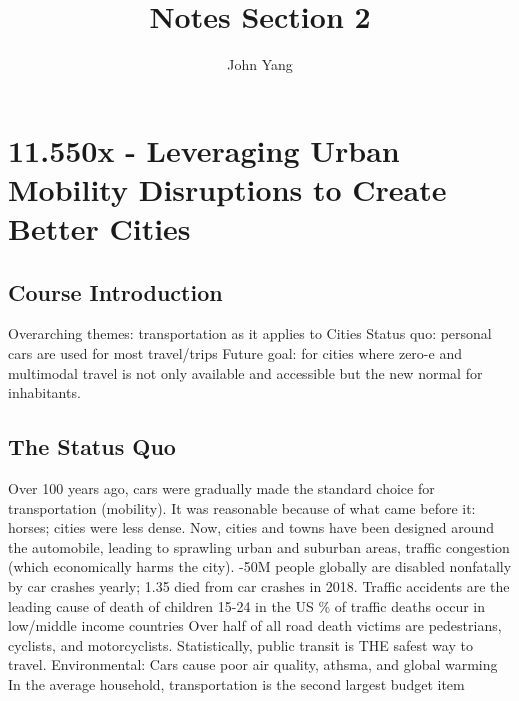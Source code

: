\documentclass{article}
\title{Notes Section 2} %
\author{John Yang}
\begin{document}
    \maketitle
    \tableofcontents
    \section{11.550x - Leveraging Urban Mobility Disruptions to Create Better Cities}
    \subsection{Course Introduction}
    \begin{outline}
        \1 Overarching themes: transportation as it applies to Cities 
            \2 Status quo: personal cars are used for most travel/trips
            \2 Future goal: for cities where zero-e and multimodal travel is not only available and accessible but the new normal for inhabitants. 

    \end{outline}
    \subsection{The Status Quo}
    \begin{outline}
        \1 Over 100 years ago, cars were gradually made the standard choice for transportation (mobility). It was reasonable because of what came before it: horses; cities were less dense. 
        \1 Now, cities and towns have been designed around the automobile, leading to sprawling urban and suburban areas, traffic congestion (which economically harms the city). 
        -50M people globally are disabled nonfatally by car crashes yearly; 1.35 died from car crashes in 2018. 
        \1 Traffic accidents are the leading cause of death of children 15-24 in the US 
        \% of traffic deaths occur in low/middle income countries
        \1 Over half of all road death victims are pedestrians, cyclists, and motorcyclists. 
        \1 Statistically, public transit is THE safest way to travel. 
        \1 Environmental: Cars cause poor air quality, athsma, and global warming
        \1 In the average household, transportation is the second largest budget item 

    \end{outline}
\end{document}
